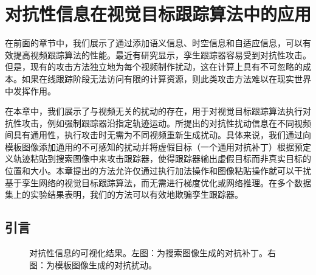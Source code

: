 \chapter{对抗性信息在视觉目标跟踪算法中的应用} \label{chap:attack}
在前面的章节中，我们展示了通过添加语义信息、时空信息和自适应信息，可以有效提高视频跟踪算法的性能。最近有研究显示，孪生跟踪器容易受到对抗性攻击。但是，现有的攻击方法独立地为每个视频制作扰动，这在计算上具有不可忽略的成本。如果在线跟踪阶段无法访问有限的计算资源，则此类攻击方法难以在现实世界中发挥作用。

在本章中，我们展示了与视频无关的扰动的存在，用于对视觉目标跟踪算法执行对抗性攻击，例如强制跟踪器沿指定轨迹运动。所提出的对抗性扰动信息在不同视频间具有通用性，执行攻击时无需为不同视频重新生成扰动。具体来说，我们通过向模板图像添加通用的不可感知的扰动并将虚假目标（一个通用对抗补丁）根据预定义轨迹粘贴到搜索图像中来攻击跟踪器，使得跟踪器输出虚假目标而非真实目标的位置和大小。本章提出的方法允许仅通过执行加法操作和图像粘贴操作就可以干扰基于孪生网络的视觉目标跟踪算法，而无需进行梯度优化或网络推理。在多个数据集上的实验结果表明，我们的方法可以有效地欺骗孪生跟踪器。

\section{引言}

\begin{figure}[t]
\centering
{} \qquad \qquad 
{}
\caption{对抗性信息的可视化结果。左图：为搜索图像生成的对抗补丁。右图：为模板图像生成的对抗扰动。}
\label{fig:attack}
\end{figure}

